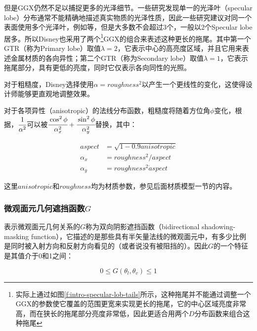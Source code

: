 但是GGX仍然不足以捕捉更多的光泽细节。一些研究发现单一的光泽叶（specular lobe）分布通常不能精确地描述真实物质的光泽性质，因此一些研究建议对同一个表面使用多个光泽叶，例如\cite{a:GlobalOptimizationforEstimatingaMultiple-LobeAnalyticalBRDF}等，但是大多数不会超过3个，一般以2个Specular lobe居多。所以Disney也采用了两个\footnote{实际上通过如图\ref{f:intro-specular-lob-tails}所示，这种拖尾并不能通过调整一个GGX的参数使它覆盖的范围更宽来实现更长的拖尾，它的中心区域亮度非常高，而在狭长的拖尾部分亮度非常低，因此更适合用两个$D$分布函数来组合这种拖尾}GGX的组合来表述这种更长的拖尾。其中第一个GTR（称为Primary lobe）取值$\lambda=2$，它表示中心的高亮度区域，并且它用来表述金属材质的各向异性；第二个GTR（称为Secondary lobe）取值$\lambda=1$，它表示拖尾部分，具有更低的亮度，同时它仅表示各向同性的光照。

对于粗糙度，Disney选择使用$\alpha=roughness^2$以产生一个更线性的变化，这使得设计师能够更直观地调整效果。

对于各项异性（anisotropic）的法线分布函数，粗糙度将随着方位角$\phi$变化，根据\cite{a:PhysicallyBasedShadingatDisney}，$ \cfrac{1}{\alpha^2}$可以被$ \cfrac{\cos^2\phi}{\alpha^2_x}+ \cfrac{\sin^2\phi}{\alpha^2_y}$替换，其中：

\begin{equation}
\begin{aligned}
	aspect&=\sqrt{1-0.9 anisotropic}\\
	\alpha_x &=roughness^2/aspect\\
		\alpha_y &=roughness^2\dot aspect
\end{aligned}
\end{equation}

\noindent 这里$anisotropic$和$roughness$均为材质参数，参见后面材质模型一节的内容。




\subsubsection{微观面元几何遮挡函数$G$}
表示微观面元几何关系的$G$称为双向阴影遮挡函数（bidirectional shadowing-masking function），它描述的是那些具有半矢量法线的微观面元中，有多少比例是同时被入射方向和反射方向看见的（或者说没有被阻挡的）。因此$G$的一个特征是其值介于0和1之间：

\begin{equation}
	0\leq G(\theta_l,\theta_v)\leq 1
\end{equation}

